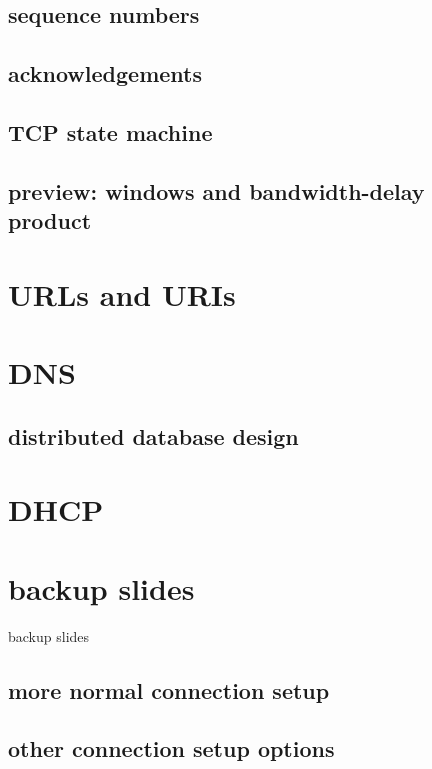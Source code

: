 \subsection{sequence numbers}

\subsection{acknowledgements}

\subsection{TCP state machine}

\subsection{preview: windows and bandwidth-delay product}

\section{URLs and URIs}

\section{DNS}

\subsection{distributed database design}

\section{DHCP}



\section{backup slides}
\begin{frame}{backup slides}
\end{frame}

\subsection{more normal connection setup}



\subsection{other connection setup options}





